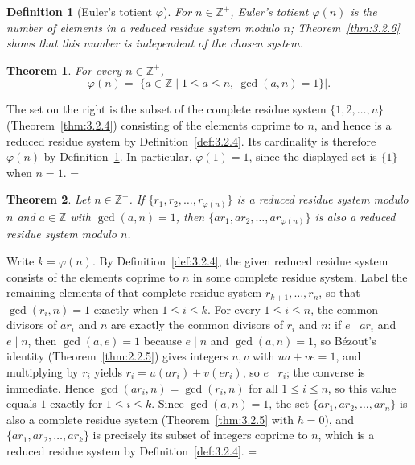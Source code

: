 \documentclass[11pt]{article}
\makeatletter
\let\nt@closedisplay\]
\def\nt@guardedclose{\@ifnextchar\par{\nt@closeafterpar}{\@ifnextchar\end{\postdisplaypenalty\@M\nt@closedisplay}{\nt@closedisplay}}}
\def\nt@closeafterpar\par{\@ifnextchar\par{\nt@closeafterpar}{\@ifnextchar\end{\postdisplaypenalty\@M\nt@closedisplay\par}{\nt@closedisplay\par}}}
\renewenvironment{proof}[1][\proofname]{\par
  \pushQED{\qed}\normalfont\topsep\medskipamount\edef\nt@afterproof{\@endparpenalty=\the\@endparpenalty\relax}\@beginparpenalty\@M\@endparpenalty\@M\let\]\nt@guardedclose\trivlist\item[]\textit{#1\@addpunct{.}} \ignorespaces}{\ifvmode\addpenalty\@M\fi\popQED\nt@afterproof\endtrivlist\@endpefalse}
\theoremstyle{ntstyle}
\newtheorem{theorem}{Theorem}[subsection]
\newtheorem{definition}{Definition}[subsection]
\makeatother
\begin{document}
\begin{definition}[Euler's totient $\varphi$]\label{def:3.2.5}\label{def:euler-totient-phi}
  For $n\in\mathbb{Z}^+$, Euler's totient
  $\varphi(n)$ is the number of elements in a reduced residue
  system modulo $n$; Theorem~\ref{thm:3.2.6} shows that this number is independent of
  the chosen system.

\end{definition}

\begin{theorem}\label{thm:3.2.7} For every $n\in\mathbb{Z}^+$,
  \[
    \varphi(n)=\big|\{a\in\mathbb{Z} \mid 1\le a\le n,\ \gcd(a,n)=1\}\big|.
  \]

\end{theorem}

\begin{proof} The set on the right is the subset of the
  complete residue system $\{1,2,\ldots,n\}$ (Theorem~\ref{thm:3.2.4}) consisting
  of the elements coprime to $n$, and hence is a reduced residue system by
  Definition~\ref{def:3.2.4}. Its cardinality is therefore $\varphi(n)$ by
  Definition~\ref{def:3.2.5}. In particular, $\varphi(1)=1$, since the
  displayed set is $\{1\}$ when $n=1$.
\end{proof}

\begin{theorem}\label{thm:3.2.8} Let $n\in\mathbb{Z}^+$. If $\{r_1, r_2, \ldots, r_{\varphi(n)}\}$ is a
  reduced residue system modulo $n$ and $a \in \mathbb{Z}$ with
  $\gcd(a, n)=1$, then $\{a r_1, a r_2, \ldots, a r_{\varphi(n)}\}$ is also a
  reduced residue system modulo $n$.

\end{theorem}

\begin{proof} Write $k=\varphi(n)$. By Definition~\ref{def:3.2.4}, the
  given reduced residue system consists of the elements coprime to $n$
  in some complete residue system. Label the remaining elements of that complete residue system
  $r_{k+1},\ldots,r_n$, so that $\gcd(r_i,n)=1$ exactly when $1\le i\le k$. For every $1 \le i \le n$, the common
  divisors of $ar_i$ and $n$ are exactly the common divisors of $r_i$
  and $n$: if $e\mid ar_i$ and $e\mid n$, then $\gcd(a, e)=1$ because
  $e\mid n$ and $\gcd(a, n)=1$, so Bézout's identity (Theorem~\ref{thm:2.2.5})
  gives integers $u,v$ with
  $ua+ve=1$, and multiplying by $r_i$ yields $r_i=u(ar_i)+v(er_i)$, so
  $e\mid r_i$; the converse is immediate. Hence $\gcd(ar_i, n) = \gcd(r_i, n)$ for all $1 \le i \le n$, so this
  value equals $1$
  exactly for $1 \le i \le k$. Since $\gcd(a, n)=1$, the set $\{a r_1, a r_2, \ldots, a r_n\}$ is also a complete
  residue system
  (Theorem~\ref{thm:3.2.5} with $h = 0$), and $\{a r_1, a r_2, \ldots, a r_k\}$ is
  precisely
  its subset of integers coprime to $n$, which is a reduced residue
  system by Definition~\ref{def:3.2.4}.
\end{proof}
\end{document}

